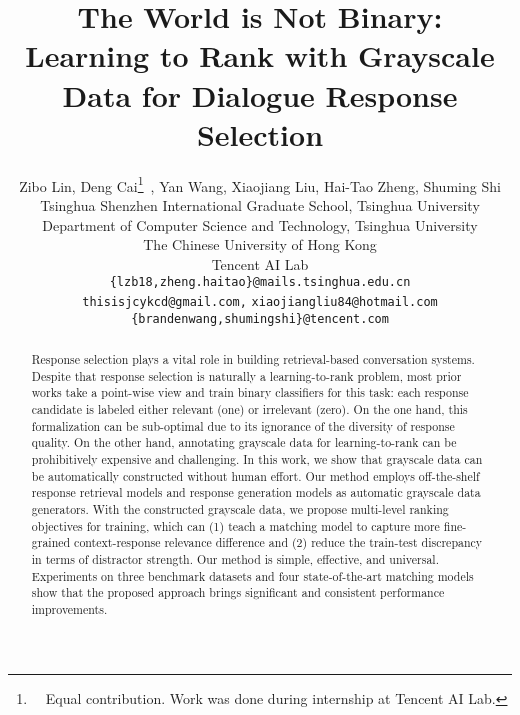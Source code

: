 \documentclass[11pt,a4paper]{article}
\title{The World is Not Binary:\\ Learning to Rank with Grayscale Data for Dialogue Response Selection}
\author{Zibo Lin\footnotemark[1], Deng Cai\thanks{~~Equal contribution. Work was done during internship at Tencent AI Lab.}~, Yan Wang, Xiaojiang Liu, Hai-Tao Zheng, Shuming Shi \\ Tsinghua Shenzhen International Graduate School, Tsinghua University \\Department of Computer Science and Technology, Tsinghua University \\The Chinese University of Hong Kong \\Tencent AI Lab \\ {\tt \{lzb18,zheng.haitao\}@mails.tsinghua.edu.cn}\\ {\tt thisisjcykcd@gmail.com}{\tt ,} {\tt xiaojiangliu84@hotmail.com}\\ {\tt \{brandenwang,shumingshi\}@tencent.com}}
\date{}
\begin{document}
	\maketitle
	\begin{abstract}
		Response selection plays a vital role in building retrieval-based conversation systems. Despite that response selection is naturally a learning-to-rank problem, most prior works take a point-wise view and train binary classifiers for this task: each response candidate is labeled either relevant (one) or irrelevant (zero). On the one hand, this formalization can be sub-optimal due to its ignorance of the diversity of response quality. On the other hand, annotating grayscale data for learning-to-rank can be prohibitively expensive and challenging. In this work, we show that grayscale data can be automatically constructed without human effort. Our method employs off-the-shelf response retrieval models and response generation models as automatic grayscale data generators. With the constructed grayscale data, we propose multi-level ranking objectives for training, which can (1) teach a matching model to capture more fine-grained context-response relevance difference and (2) reduce the train-test discrepancy in terms of distractor strength. Our method is simple, effective, and universal. Experiments on three benchmark datasets and four state-of-the-art matching models show that the proposed approach brings significant and consistent performance improvements.
	\end{abstract}
\end{document}
